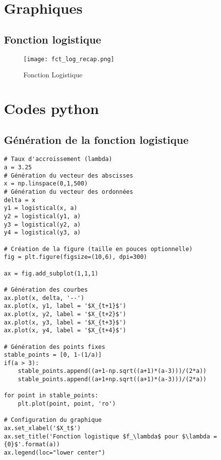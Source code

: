\begin{appendices}
    \renewcommand\thefigure{\thesection.\arabic{figure}}
    \appendixheaderon
    \section{Graphiques}
    \label{ann:graphiques}

    \subsection{Fonction logistique}
    \begin{figure}[ht]
        \centering
        \label{ann:cycles}
        \texttt{[image: fct\_log\_recap.png]}
        \caption{Fonction Logistique}
    \end{figure}

    \newpage
    \section{Codes python}
    \label{ann:code}

    \subsection{Génération de la fonction logistique}
    \begin{verbatim}
# Taux d'accroissement (lambda)
a = 3.25
# Génération du vecteur des abscisses
x = np.linspace(0,1,500)
# Génération du vecteur des ordonnées
delta = x
y1 = logistical(x, a)
y2 = logistical(y1, a)
y3 = logistical(y2, a)
y4 = logistical(y3, a)

# Création de la figure (taille en pouces optionnelle)
fig = plt.figure(figsize=(10,6), dpi=300)

ax = fig.add_subplot(1,1,1)

# Génération des courbes
ax.plot(x, delta, '--')
ax.plot(x, y1, label = '$X_{t+1}$')
ax.plot(x, y2, label = '$X_{t+2}$')
ax.plot(x, y3, label = '$X_{t+3}$')
ax.plot(x, y4, label = '$X_{t+4}$')

# Génération des points fixes
stable_points = [0, 1-(1/a)]
if(a > 3):
    stable_points.append((a+1-np.sqrt((a+1)*(a-3)))/(2*a))
    stable_points.append((a+1+np.sqrt((a+1)*(a-3)))/(2*a))

for point in stable_points:
    plt.plot(point, point, 'ro')

# Configuration du graphique
ax.set_xlabel('$X_t$')
ax.set_title('Fonction logistique $f_\lambda$ pour $\lambda = {0}$'.format(a))
ax.legend(loc="lower center")


\end{verbatim}
\end{appendices}
